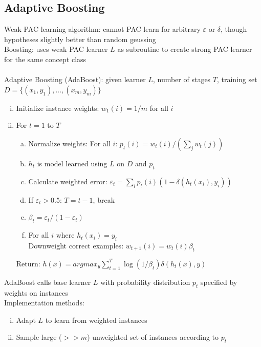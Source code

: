 \documentclass{article}
\begin{document}
 		\subsection{Adaptive Boosting}
 			Weak PAC learning algorithm: cannot PAC learn for arbitrary $\varepsilon$ or $\delta$, though hypotheses slightly better than random geussing \\
 			Boosting: uses weak PAC learner $L$ as subroutine to create strong PAC learner for the same concept class \\
 			\\
 			Adaptive Boosting (AdaBoost): given learner $L$, number of stages $T$, training set $D = \{(x_1, y_1), ..., (x_m, y_m)\}$
 			\begin{enumerate}[(i)]
 				\item Initialize instance weights: $w_1(i) = 1/m$ for all $i$
 				\item For $t = 1$ to $T$
 				\begin{enumerate}[(a)]
 					\item Normalize weights: For all $i$: $p_t(i) = w_t(i)/(\sum_j w_t(j))$
 					\item $h_t$ is model learned using $L$ on $D$ and $p_t$ \\
 					\item Calculate weighted error: $\varepsilon_t = \sum_i p_t(i)(1 - \delta(h_t(x_i), y_i))$
 					\item If $\varepsilon_t > 0.5$: $T = t - 1$, break
 					\item $\beta_t = \varepsilon_t/(1 - \varepsilon_t)$
 					\item For all $i$ where $h_t(x_i) = y_i$ \\
 					Downweight correct examples: $w_{t + 1}(i) = w_t(i)\beta_t$
 					\end{enumerate}
 				Return: $h(x) = argmax_y \sum_{t = 1}^T \log(1/\beta_t)\delta(h_t(x), y)$
 				\end{enumerate}
 			AdaBoost calls base learner $L$ with probability distribution $p_t$ specified by weights on instances \\
 			Implementation methods:
 			\begin{enumerate}[(i)]
 				\item Adapt $L$ to learn from weighted instances
 				\item Sample large ($>> m$) unweighted set of instances according to $p_t$
 				\end{enumerate}
\end{document}

